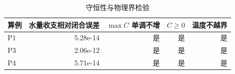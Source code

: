 \begin{table}[H]
\centering
\caption{守恒性与物理界检验}
\label{tab:cons}
\footnotesize
\begin{tabular}{@{}lrrrr@{}}
\toprule
算例 & 水量收支相对闭合误差 & $\max C$ 单调不增 & $C\ge0$ & 温度不越界 \\
\midrule
P1 & 5.28e-14 & 是 & 是 & 是 \\
P3 & 2.06e-12 & 是 & 是 & 是 \\
P4 & 5.71e-14 & 是 & 是 & 是 \\
\bottomrule
\end{tabular}
\end{table}
